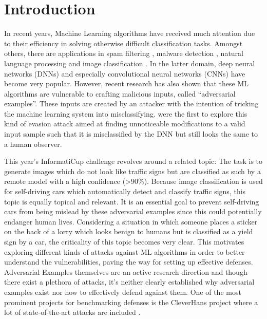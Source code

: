 \section{Introduction}

In recent years, Machine Learning algorithms have received much attention due to their efficiency in solving otherwise difficult classification tasks.
Amongst others, there are applications in spam filtering \cite{ruan2010three, clark2003neural}, malware detection \cite{dahl2013large}, natural language processing \cite{collobert2008unified} and image classification \cite{simonyan2014very, he2016deep}.
In the latter domain, deep neural networks (DNNs) and especially convolutional neural networks (CNNs) have become very popular.
However, recent research has also shown that these ML algorithms are vulnerable to crafting malicious inputs, called \enquote{adversarial examples}.
These inputs are created by an attacker with the intention of tricking the machine learning system into misclassifying.
\citet{szegedy2013intriguing} were the first to explore this kind of evasion attack aimed at finding unnoticeable modifications to a valid input sample such that it is misclassified by the DNN but still looks the same to a human observer.

This year's InformatiCup challenge revolves around a related topic: The task is to generate images which do not look like traffic signs but are classified as such by a remote model with a high confidence (>90\%).
Because image classification is used for self-driving cars which automatically detect and classify traffic signs, this topic is equally topical and relevant.
It is an essential goal to prevent self-driving cars from being mislead by these adversarial examples since this could potentially endanger human lives.
Considering a situation in which someone places a sticker on the back of a lorry which looks benign to humans but is classified as a yield sign by a car, the criticality of this topic becomes very clear.
This motivates exploring different kinds of attacks against ML algorithms in order to better understand the vulnerabilities, paving the way for setting up effective defenses.
Adversarial Examples themselves are an active research direction and though there exist a plethora of attacks, it's neither clearly established why adversarial examples exist nor how to effectively defend against them.
One of the most prominent projects for benchmarking defenses is the CleverHans project where a lot of state-of-the-art attacks are included \cite{papernot2016cleverhans}.

